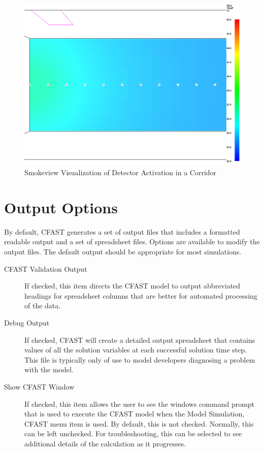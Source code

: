 \begin{figure}[h!]
\begin{center}
\includegraphics[width=6.5in]{FIGURES/SMV_Detectors}
\caption{Smokeview Visualization of Detector Activation in a Corridor}
\end{center}
\end{figure}

\section{Output Options}

By default, CFAST generates a set of output files that includes a formatted readable output and a set of spreadsheet files.  Options are available to modify the output files.  The default output should be appropriate for most simulations.

\begin{description}
    \item[CFAST Validation Output] If checked, this item directs the CFAST model to output abbreviated headings for spreadsheet columns that are better for automated processing of the data.
    \item[Debug Output] If checked, CFAST will create a detailed output spreadsheet that contains values of all the solution variables at each successful solution time step. This file is typically only of use to model developers diagnosing a problem with the model.
    \item[Show CFAST Window] If checked, this item allows the user to see the windows command prompt that is used to execute the CFAST model when the Model Simulation, CFAST menu item is used.  By default, this is not checked.  Normally, this can be left unchecked.  For troubleshooting, this can be selected to see additional details of the calculation as it progresses.
\end{description}




